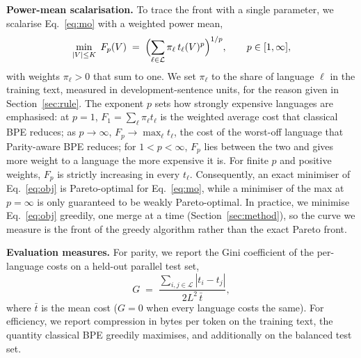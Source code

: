 \noindent\textbf{Power-mean scalarisation.}
To trace the front with a single parameter, we scalarise Eq.~\eqref{eq:mo} with a weighted
power mean,
\begin{equation}
  \min_{|V|\le K}\; F_p(V) \;=\;
  \Bigl(\sum_{\ell\in\mathcal{L}} \pi_\ell\, t_\ell(V)^{p}\Bigr)^{1/p},
  \qquad p\in[1,\infty],
  \label{eq:obj}
\end{equation}
with weights $\pi_\ell>0$ that sum to one. We set $\pi_\ell$ to the share of language $\ell$
in the training text, measured in development-sentence units, for the reason given in
Section~\ref{sec:rule}. The exponent $p$ sets how strongly expensive
languages are emphasised: at $p=1$, $F_1=\sum_\ell \pi_\ell t_\ell$ is the weighted average
cost that classical BPE reduces; as $p\to\infty$, $F_p\to\max_\ell t_\ell$, the cost of the
worst-off language that Parity-aware BPE reduces; for $1<p<\infty$, $F_p$ lies between the
two and gives more weight to a language the more expensive it is. For finite $p$ and positive weights, $F_p$ is strictly increasing in every $t_\ell$.
Consequently, an exact minimiser of Eq.~\eqref{eq:obj} is Pareto-optimal for
Eq.~\eqref{eq:mo}, while a minimiser of the max at $p=\infty$ is only guaranteed to be
weakly Pareto-optimal. In practice, we minimise Eq.~\eqref{eq:obj} greedily, one merge at a
time (Section~\ref{sec:method}), so the curve we measure is the front of the greedy
algorithm rather than the exact Pareto front.

\noindent\textbf{Evaluation measures.}
For parity, we report the Gini coefficient of the per-language costs on a held-out parallel
test set,
\begin{equation}
  G \;=\; \frac{\sum_{i,j\in\mathcal{L}} |t_i - t_j|}{2L^2\,\bar t},
  \label{eq:gini}
\end{equation}
where $\bar t$ is the mean cost ($G=0$ when every language costs the same). For efficiency,
we report compression in bytes per token on the training text, the quantity classical BPE
greedily maximises, and additionally on the balanced test set.
